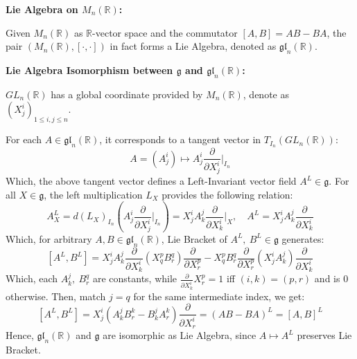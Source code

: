 \documentclass[20pt,margin=0.9in,innermargin=-4.5in,blockverticalspace=-0.25in]{tikzposter}
\begin{document}
\begin{columns}
{\begin{exampleBox}
            \hfil

            \textbf{Lie Algebra on $M_n(\mathbb{R})$:}

            Given $M_n(\mathbb{R})$ as $\mathbb{R}$-vector space and the commutator $[A,B]=AB-BA$, the pair $(M_n(\mathbb{R}),[\cdot,\cdot])$ in fact forms a Lie Algebra, denoted as $\mathfrak{gl}_n(\mathbb{R})$.

            

            \hfil

            \textbf{Lie Algebra Isomorphism between $\mathfrak{g}$ and $\mathfrak{gl}_n(\mathbb{R})$:}

            $GL_n(\mathbb{R})$ has a global coordinate provided by $M_n(\mathbb{R})$, denote as $(X^i_j)_{1\leq i,j\leq n}$.
            
            For each $A\in \mathfrak{gl}_n(\mathbb{R})$, it corresponds to a tangent vector in $T_{I_n}(GL_n(\mathbb{R}))$:
            $$A = (A^i_j)\mapsto A^i_j\frac{\partial}{\partial X^i_j}\bigg|_{I_n}$$
            Which, the above tangent vector defines a Left-Invariant vector field $A^L\in \mathfrak{g}$. For all $X\in \mathfrak{g}$, the left multiplication $L_X$ provides the following relation:
            $$A^L_X=d(L_X)_{I_n}\left(A^i_j\frac{\partial}{\partial X^i_j}\bigg|_{I_n}\right) = X^i_j A^j_k\frac{\partial}{\partial X^i_k}\bigg|_{X},\quad A^L=X^i_j A^j_k\frac{\partial}{\partial X^i_k}$$
            Which, for arbitrary $A,B\in\mathfrak{gl}_n(\mathbb{R})$, Lie Bracket of $A^L,\ B^L\in\mathfrak{g}$ generates:
            $$\left[A^L,B^L\right] = X^i_jA^j_k\frac{\partial}{\partial X^i_k}(X^p_qB^q_r)\frac{\partial}{\partial X^p_r}-X^p_qB^q_r\frac{\partial}{\partial X^p_r}(X^i_jA^j_k)\frac{\partial}{\partial X^i_k}$$
            Which, each $A^j_k,\ B^q_r$ are constants, while $\frac{\partial}{\partial X^i_k}X^p_r = 1$ iff $(i,k)=(p,r)$ and is $0$ otherwise. Then, match $j=q$ for the same intermediate index, we get:
            $$\left[A^L,B^L\right] = X^i_j(A^j_kB^k_r-B^j_kA^k_r)\frac{\partial}{\partial X^i_r} = (AB-BA)^L=[A,B]^L$$
            Hence, $\mathfrak{gl}_n(\mathbb{R})$ and $\mathfrak{g}$ are isomorphic as Lie Algebra, since $A\mapsto A^L$ preserves Lie Bracket.
        \end{exampleBox}
    }

\end{columns}
\end{document}
